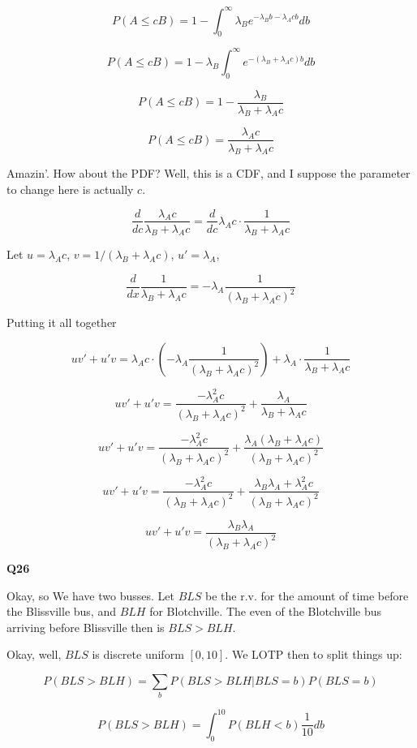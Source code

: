\documentclass{article}
\begin{document}
			\[ P(A\le cB) = 1 - \int^\infty_0\lambda_Be^{-\lambda_B b-\lambda_Acb} db \]
			
			\[ P(A\le cB) = 1 - \lambda_B\int^\infty_0e^{-(\lambda_B +\lambda_Ac)b} db \]
			
			\[ P(A\le cB) = 1 - \frac{\lambda_B}{\lambda_B + \lambda_Ac}  \]
			
			\[ P(A\le cB) = \frac{\lambda_Ac}{\lambda_B + \lambda_Ac}  \]
			
			Amazin'. How about the PDF? Well, this is a CDF, and I suppose the parameter to change here is actually $c$.
			
			\[ \frac{d}{dc}\frac{\lambda_Ac}{\lambda_B + \lambda_Ac} = \frac{d}{dc}\lambda_Ac\cdot \frac{1}{\lambda_B + \lambda_Ac} \]

			Let $u = \lambda_Ac$, $v = 1/(\lambda_B + \lambda_Ac)$, $u' = \lambda_A$,
			
			\[ \frac{d}{dx} \frac{1}{\lambda_B + \lambda_Ac} = -\lambda_A\frac{1}{(\lambda_B + \lambda_Ac)^2} \]

			Putting it all together
			
			\[ uv' + u'v = \lambda_Ac\cdot \left(-\lambda_A\frac{1}{(\lambda_B + \lambda_Ac)^2}\right) + \lambda_A\cdot\frac{1}{\lambda_B + \lambda_Ac}  \]
			
			\[ uv' + u'v = \frac{-\lambda_A^2c}{(\lambda_B + \lambda_Ac)^2} + \frac{\lambda_A}{\lambda_B + \lambda_Ac}  \]
			
			\[ uv' + u'v = \frac{-\lambda_A^2c}{(\lambda_B + \lambda_Ac)^2} + \frac{\lambda_A(\lambda_B + \lambda_Ac)}{(\lambda_B + \lambda_Ac)^2}  \]
			
			\[ uv' + u'v = \frac{-\lambda_A^2c}{(\lambda_B + \lambda_Ac)^2} + \frac{\lambda_B\lambda_A + \lambda_A^2c}{(\lambda_B + \lambda_Ac)^2}  \]
			 
			\[ uv' + u'v = \frac{\lambda_B\lambda_A }{(\lambda_B + \lambda_Ac)^2}  \]
			 
			\hfill
			
		\textbf{Q26}

			Okay, so We have two busses. Let $BLS$ be the r.v. for the amount of time before the Blissville bus, and $BLH$ for Blotchville. The even of the Blotchville bus arriving before Blissville then is $BLS > BLH$.
			
			Okay, well, $BLS$ is discrete uniform $[0, 10]$. We LOTP then to split things up:
			
			\[ P(BLS>BLH) = \sum_{b} P(BLS>BLH|BLS=b)P(BLS=b) \]
			
			\[ P(BLS>BLH) = \int_0^{10} P(BLH<b) \frac{1}{10} db \]
			
\end{document}
